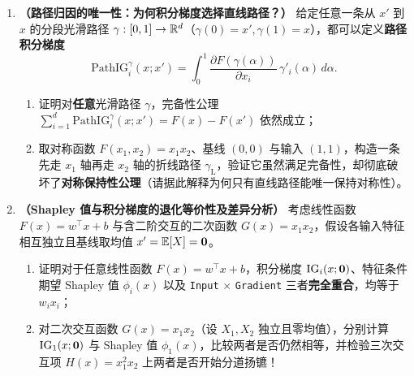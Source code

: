 \begin{enumerate}[label=\textbf{7.4.\arabic*}, start=3]
  \item \textbf{（路径归因的唯一性：为何积分梯度选择直线路径？）} 给定任意一条从 $x'$ 到 $x$ 的分段光滑路径 $\gamma: [0,1] \to \mathbb{R}^d$（$\gamma(0)=x', \gamma(1)=x$），都可以定义\textbf{路径积分梯度}
  \[
    \mathrm{PathIG}_i^\gamma(x; x') = \int_0^1 \frac{\partial F(\gamma(\alpha))}{\partial x_i}\,\gamma'_i(\alpha)\,d\alpha.
  \]
  \begin{enumerate}
    \item 证明对\textbf{任意}光滑路径 $\gamma$，完备性公理 $\sum_{i=1}^d \mathrm{PathIG}_i^\gamma(x; x') = F(x) - F(x')$ 依然成立；
    \item 取对称函数 $F(x_1, x_2) = x_1 x_2$、基线 $(0,0)$ 与输入 $(1,1)$，构造一条先走 $x_1$ 轴再走 $x_2$ 轴的折线路径 $\gamma_{\text{L}}$，验证它虽然满足完备性，却彻底破坏了\textbf{对称保持性公理}（请据此解释为何只有直线路径能唯一保持对称性）。
  \end{enumerate}

  \item \textbf{（Shapley 值与积分梯度的退化等价性及差异分析）} 考虑线性函数 $F(x) = w^\top x + b$ 与含二阶交互的二次函数 $G(x) = x_1 x_2$，假设各输入特征相互独立且基线取均值 $x' = \mathbb{E}[X] = \mathbf{0}$。
  \begin{enumerate}
    \item 证明对于任意线性函数 $F(x) = w^\top x + b$，积分梯度 $\operatorname{IG}_i(x; \mathbf{0})$、特征条件期望 Shapley 值 $\phi_i(x)$ 以及 \texttt{Input} $\times$ \texttt{Gradient} 三者\textbf{完全重合}，均等于 $w_i x_i$；
    \item 对二次交互函数 $G(x) = x_1 x_2$（设 $X_1, X_2$ 独立且零均值），分别计算 $\operatorname{IG}_1(x; \mathbf{0})$ 与 Shapley 值 $\phi_1(x)$，比较两者是否仍然相等，并检验三次交互项 $H(x) = x_1^2 x_2$ 上两者是否开始分道扬镳！
  \end{enumerate}
\end{enumerate}



